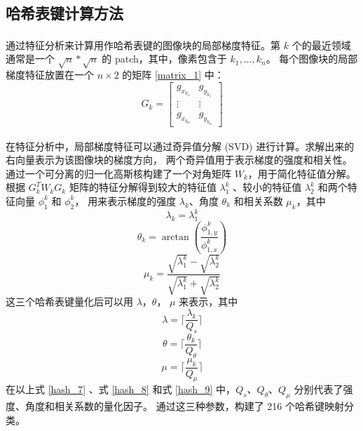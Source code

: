 \documentclass[12pt, a4paper, oneside]{ctexbook}
\begin{document}
	\subsection{哈希表键计算方法}
	通过特征分析\textsuperscript{\cite{6}}来计算用作哈希表键的图像块的局部梯度特征。第 $k$ 个的最近领域通常是一个 $\sqrt{n}*\sqrt{n}$ 的 patch，其中，像素包含于 $k_1,...,k_n$。
	每个图像块的局部梯度特征放置在一个 $n \times 2$ 的矩阵 \ref{matrix_1} 中：
	\begin{equation}
	G_k=
	\left[
	\begin{matrix}
		{g_{x_{k_1}}} & {g_{y_{k_1}}}\\
		\vdots & \vdots\\
		{g_{x_{k_n}}} & {g_{y_{k_n}}}
	\end{matrix}
	\right]\label{matrix_1}
	\end{equation}
	\par 在特征分析\textsuperscript{\cite{6}}中，局部梯度特征可以通过奇异值分解 (SVD) 进行计算。求解出来的右向量表示为该图像块的梯度方向，
	两个奇异值用于表示梯度的强度和相关性。通过一个可分离的归一化高斯核构建了一个对角矩阵 $W_k$，用于简化特征值分解。
	根据 $G_k^TW_kG_k$ 矩阵的特征分解得到较大的特征值 $\lambda_1^k$ 、较小的特征值 $\lambda_2^k$ 和两个特征向量 $\phi_1^k$ 和 $\phi_2^k$，
	用来表示梯度的强度 $\lambda_k$、角度 $\theta_k$ 和相关系数 $\mu_k$，其中
	\begin{equation}
		\lambda_k=\lambda_1^k
	\end{equation}
	\begin{equation}
		\theta_k=\arctan(\frac{\phi_{1,y}^k}{\phi_{1,x}^k}) 
	\end{equation}
	\begin{equation}
		\mu_k=\frac{\sqrt{\lambda_1^k}-\sqrt{\lambda_2^k}}{\sqrt{\lambda_1^k}+\sqrt{\lambda_2^k}} 
	\end{equation}
	这三个哈希表键量化后可以用 $\lambda$，$\theta$， $\mu$ 来表示，其中
	\begin{equation}
		\lambda=\lceil\frac{\lambda_k}{Q_s}\rceil		\label{hash_7}
	\end{equation}
	\begin{equation}
		\theta=\lceil\frac{\theta_k}{Q_\theta}\rceil	\label{hash_8}
	\end{equation}
	\begin{equation}
		\mu=\lceil\frac{\mu_k}{Q_\mu}\rceil				\label{hash_9}
	\end{equation}
	在以上式 \ref{hash_7} 、式 \ref{hash_8} 和式 \ref{hash_9} 中，$Q_s$、$Q_\theta$、$Q_\mu$ 分别代表了强度、角度和相关系数的量化因子。
	通过这三种参数，构建了 216 个哈希键映射分类。
	
\end{document}
